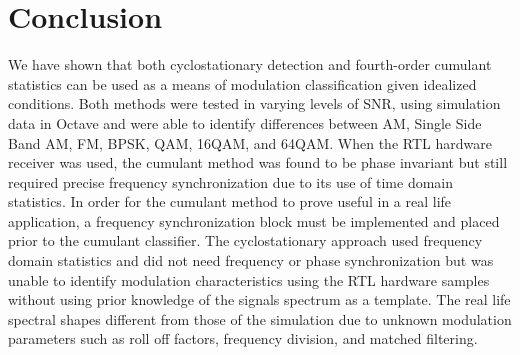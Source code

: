 \section{Conclusion}

We have shown that both cyclostationary detection and fourth-order cumulant
statistics can be used as a means of modulation classification given idealized
conditions. Both methods were tested in varying levels of SNR, using simulation
data in Octave and were able to identify differences between AM, Single Side Band AM, FM, BPSK, QAM, 16QAM, and 64QAM. 
When the RTL hardware receiver was used, the cumulant method was found to be
phase invariant but still required precise frequency synchronization due to its
use of time domain statistics.  In order for the cumulant method to prove
useful in a real life application, a frequency synchronization block must be
implemented and placed prior to the cumulant classifier.  The cyclostationary
approach used frequency domain statistics and did not need frequency or phase
synchronization but was unable to identify modulation characteristics using
the RTL hardware samples without using prior knowledge of the signals spectrum
as a template.  The real life spectral shapes different from those of the
simulation due to unknown modulation parameters such as roll off factors,
frequency division, and  matched filtering.
